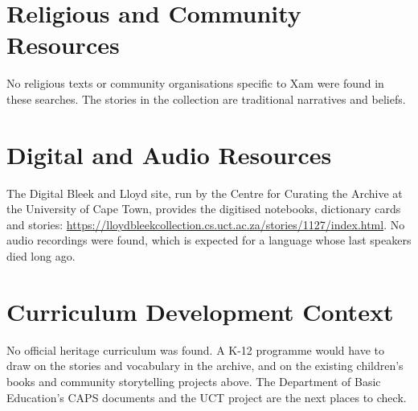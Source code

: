 \documentclass[12pt]{article}
\begin{document}
\section{Religious and Community Resources}
No religious texts or community organisations specific to \textbar Xam were found in these searches. The stories in the collection are traditional narratives and beliefs.

\section{Digital and Audio Resources}
The Digital Bleek and Lloyd site, run by the Centre for Curating the Archive at the University of Cape Town, provides the digitised notebooks, dictionary cards and stories: \url{https://lloydbleekcollection.cs.uct.ac.za/stories/1127/index.html}. No audio recordings were found, which is expected for a language whose last speakers died long ago.

\section{Curriculum Development Context}
No official heritage curriculum was found. A K-12 programme would have to draw on the stories and vocabulary in the archive, and on the existing children's books and community storytelling projects above. The Department of Basic Education's CAPS documents and the UCT project are the next places to check.
\end{document}
